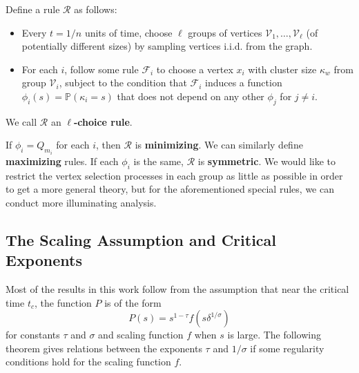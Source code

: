 \documentclass[twoside,10pt]{article}
\begin{document}
\begin{defn}[]
        Define a rule $\mathcal{R}$ as follows:
        \begin{itemize}
                \item Every $t=1/n$ units of time, choose $\ell$ groups of vertices $\mathcal{V}_1, \dots, \mathcal{V}_{\ell}$ (of potentially different sizes) by sampling vertices i.i.d. from the graph.
                \item For each $i$, follow some rule $\mathcal{F}_{i}$ to choose a vertex $x_i$ with cluster size $\kappa_w$ from group $\mathcal{V}_i$, subject to the condition that $\mathcal{F}_i$ induces a function $\phi_i(s) = \mathbb{P}\left( \kappa_i=s \right) $ that does not depend on any other $\phi_j$ for $j \neq i$.
        \end{itemize}
We call $\mathcal{R}$ an \textbf{$\ell$-choice rule}.
\end{defn}

If $\phi_{i}=Q_{m_i}$ for each $i$, then $\mathcal{R}$ is \textbf{minimizing}. We can similarly define \textbf{maximizing} rules. If each $\phi_i$ is the same, $\mathcal{R}$ is \textbf{symmetric}. We would like to restrict the vertex selection processes in each group as little as possible in order to get a more general theory, but for the aforementioned special rules, we can conduct more illuminating analysis.

\subsection{The Scaling Assumption and Critical Exponents}
\label{scaling-assumption}

Most of the results in this work follow from the assumption that near the critical time $t_c$, the function $P$ is of the form
\[
        P(s) = s^{1-\tau}f(s \delta^{1/\sigma})
\] for constants $\tau$ and $\sigma$ and scaling function $f$ when $s$ is large. The following theorem gives relations between the exponents $\tau$ and $1/\sigma$ if some regularity conditions hold for the scaling function $f$.
\end{document}
